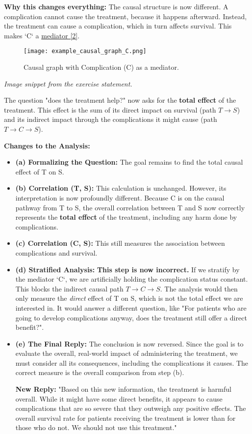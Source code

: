\documentclass[11pt,a4paper]{article}
\begin{document}
\textbf{Why this changes everything:}
The causal structure is now different. A complication cannot cause the treatment, because it happens afterward. Instead, the treatment can cause a complication, which in turn affects survival. This makes `C` a \hyperref[sec:mediation]{mediator [2]}.

\begin{figure}[H]
    \centering
    \texttt{[image: example\_causal\_graph\_C.png]}
    \caption{Causal graph with Complication (C) as a mediator.}
    \label{fig:mediator_graph}
\end{figure}
\textit{Image snippet from the exercise statement.}

The question "does the treatment help?" now asks for the \textbf{total effect} of the treatment. This effect is the sum of its direct impact on survival (path $T \to S$) and its indirect impact through the complications it might cause (path $T \to C \to S$).

\textbf{Changes to the Analysis:}
\begin{itemize}
    \item \textbf{(a) Formalizing the Question:} The goal remains to find the total causal effect of T on S.
    \item \textbf{(b) Correlation (T, S):} This calculation is unchanged. However, its interpretation is now profoundly different. Because C is on the causal pathway from T to S, the overall correlation between T and S now correctly represents the \textbf{total effect} of the treatment, including any harm done by complications.
    \item \textbf{(c) Correlation (C, S):} This still measures the association between complications and survival.
    \item \textbf{(d) Stratified Analysis:} \textbf{This step is now incorrect.} If we stratify by the mediator `C`, we are artificially holding the complication status constant. This blocks the indirect causal path $T \to C \to S$. The analysis would then only measure the \textit{direct} effect of T on S, which is not the total effect we are interested in. It would answer a different question, like "For patients who are going to develop complications anyway, does the treatment still offer a direct benefit?".
    \item \textbf{(e) The Final Reply:} The conclusion is now reversed. Since the goal is to evaluate the overall, real-world impact of administering the treatment, we must consider all its consequences, including the complications it causes. The correct measure is the overall comparison from step (b).

    \textbf{New Reply:} "Based on this new information, the treatment is harmful overall. While it might have some direct benefits, it appears to cause complications that are so severe that they outweigh any positive effects. The overall survival rate for patients receiving the treatment is lower than for those who do not. We should not use this treatment."
\end{itemize}
\end{document}
